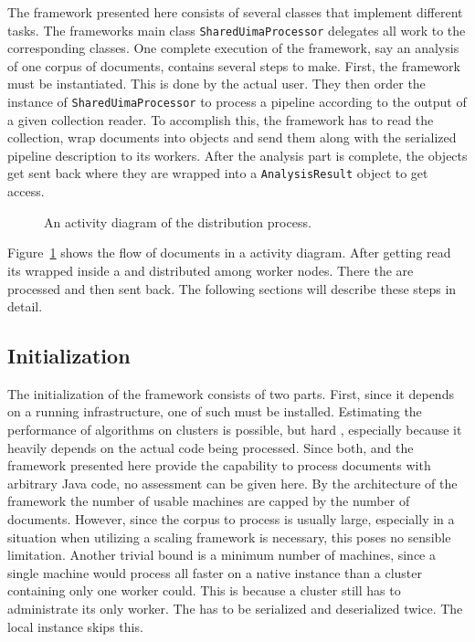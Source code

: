 The framework presented here consists of several classes that implement different tasks. The frameworks main class \lstinline|SharedUimaProcessor| delegates all work to the corresponding classes. One complete execution of the framework, say an analysis of one corpus of documents, contains several steps to make. First, the framework must be instantiated. This is done by the actual user. They then order the instance of \lstinline|SharedUimaProcessor| to process a pipeline according to the output of a given collection reader. To accomplish this, the framework has to read the collection, wrap documents into \cas{} objects and send them along with the serialized pipeline description to its workers. After the analysis part is complete, the \cas{} objects get sent back where they are wrapped into a \lstinline|AnalysisResult| object to get access. 
\begin{figure}[!htb]
	\centering
	\resizebox{0.8\linewidth}{!}{\small}
	\caption[An UML activity diagram of the CAS distribution process.]{An \uml{} activity diagram of the \cas{} distribution process.}
	\label{fig:sup_act}
\end{figure}

Figure~\ref{fig:sup_act} shows the flow of documents in a \uml{} activity diagram. After getting read its wrapped inside a \cas{} and distributed among worker nodes. There the \cas{} are processed and then sent back. The following sections will describe these steps in detail.

\subsection{Initialization}
\label{sec:init}
The initialization of the framework consists of two parts. First, since it depends on a running \spark{} infrastructure, one of such must be installed. Estimating the performance of algorithms on \spark{} clusters is possible, but hard \cite{wang2015performance,gopalani2015comparing}, especially because it heavily depends on the actual code being processed. Since both, \uima{} and the framework presented here provide the capability to process documents with arbitrary Java code, no assessment can be given here. By the architecture of the framework the number of usable machines are capped by the number of documents. However, since the corpus to process is usually large, especially in a situation when utilizing a scaling framework is necessary, this poses no sensible limitation. Another trivial bound is a minimum number of machines, since a single machine would process all \cas{} faster on a native \uima{} instance than a \spark{} cluster containing only one worker could. This is because a \spark{} cluster still has to administrate its only worker. The \cas{} has to be serialized and deserialized twice. The local \uima{} instance skips this.


